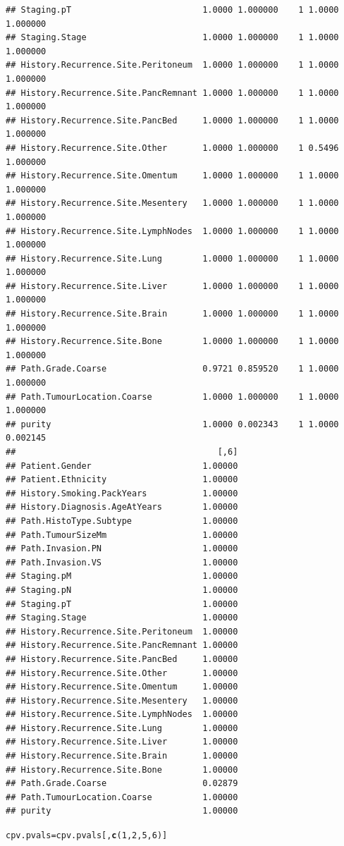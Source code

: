 \documentclass{article}\usepackage[]{graphicx}\usepackage[]{color}
\makeatletter
\newcommand{\hlnum}[1]{\textcolor[rgb]{0.686,0.059,0.569}{#1}}%
\newcommand{\hlstd}[1]{\textcolor[rgb]{0.345,0.345,0.345}{#1}}%
\newcommand{\hlkwb}[1]{\textcolor[rgb]{0.69,0.353,0.396}{#1}}%
\newcommand{\hlkwd}[1]{\textcolor[rgb]{0.737,0.353,0.396}{\textbf{#1}}}%
\newenvironment{kframe}{%
 \def\at@end@of@kframe{}%
 \ifinner\ifhmode%
  \def\at@end@of@kframe{\end{minipage}}%
  \begin{minipage}{\columnwidth}%
 \fi\fi%
 \def\FrameCommand##1{\hskip\@totalleftmargin \hskip-\fboxsep
 \colorbox{shadecolor}{##1}\hskip-\fboxsep
     \hskip-\linewidth \hskip-\@totalleftmargin \hskip\columnwidth}%
 \MakeFramed {\advance\hsize-\width
   \@totalleftmargin\z@ \linewidth\hsize
   \@setminipage}}%
 {\par\unskip\endMakeFramed%
 \at@end@of@kframe}
\newenvironment{knitrout}{}{} %
\makeatother
\begin{document}
\begin{knitrout}
\begin{kframe}
\begin{verbatim}
## Staging.pT                          1.0000 1.000000    1 1.0000 1.000000
## Staging.Stage                       1.0000 1.000000    1 1.0000 1.000000
## History.Recurrence.Site.Peritoneum  1.0000 1.000000    1 1.0000 1.000000
## History.Recurrence.Site.PancRemnant 1.0000 1.000000    1 1.0000 1.000000
## History.Recurrence.Site.PancBed     1.0000 1.000000    1 1.0000 1.000000
## History.Recurrence.Site.Other       1.0000 1.000000    1 0.5496 1.000000
## History.Recurrence.Site.Omentum     1.0000 1.000000    1 1.0000 1.000000
## History.Recurrence.Site.Mesentery   1.0000 1.000000    1 1.0000 1.000000
## History.Recurrence.Site.LymphNodes  1.0000 1.000000    1 1.0000 1.000000
## History.Recurrence.Site.Lung        1.0000 1.000000    1 1.0000 1.000000
## History.Recurrence.Site.Liver       1.0000 1.000000    1 1.0000 1.000000
## History.Recurrence.Site.Brain       1.0000 1.000000    1 1.0000 1.000000
## History.Recurrence.Site.Bone        1.0000 1.000000    1 1.0000 1.000000
## Path.Grade.Coarse                   0.9721 0.859520    1 1.0000 1.000000
## Path.TumourLocation.Coarse          1.0000 1.000000    1 1.0000 1.000000
## purity                              1.0000 0.002343    1 1.0000 0.002145
##                                        [,6]
## Patient.Gender                      1.00000
## Patient.Ethnicity                   1.00000
## History.Smoking.PackYears           1.00000
## History.Diagnosis.AgeAtYears        1.00000
## Path.HistoType.Subtype              1.00000
## Path.TumourSizeMm                   1.00000
## Path.Invasion.PN                    1.00000
## Path.Invasion.VS                    1.00000
## Staging.pM                          1.00000
## Staging.pN                          1.00000
## Staging.pT                          1.00000
## Staging.Stage                       1.00000
## History.Recurrence.Site.Peritoneum  1.00000
## History.Recurrence.Site.PancRemnant 1.00000
## History.Recurrence.Site.PancBed     1.00000
## History.Recurrence.Site.Other       1.00000
## History.Recurrence.Site.Omentum     1.00000
## History.Recurrence.Site.Mesentery   1.00000
## History.Recurrence.Site.LymphNodes  1.00000
## History.Recurrence.Site.Lung        1.00000
## History.Recurrence.Site.Liver       1.00000
## History.Recurrence.Site.Brain       1.00000
## History.Recurrence.Site.Bone        1.00000
## Path.Grade.Coarse                   0.02879
## Path.TumourLocation.Coarse          1.00000
## purity                              1.00000
\end{verbatim}
\begin{alltt}
\hlstd{cpv.pvals} \hlkwb{=} \hlstd{cpv.pvals[,} \hlkwd{c}\hlstd{(}\hlnum{1}\hlstd{,} \hlnum{2}\hlstd{,} \hlnum{5}\hlstd{,} \hlnum{6}\hlstd{)]}

\end{alltt}
\end{kframe}
\end{knitrout}
\end{document}
